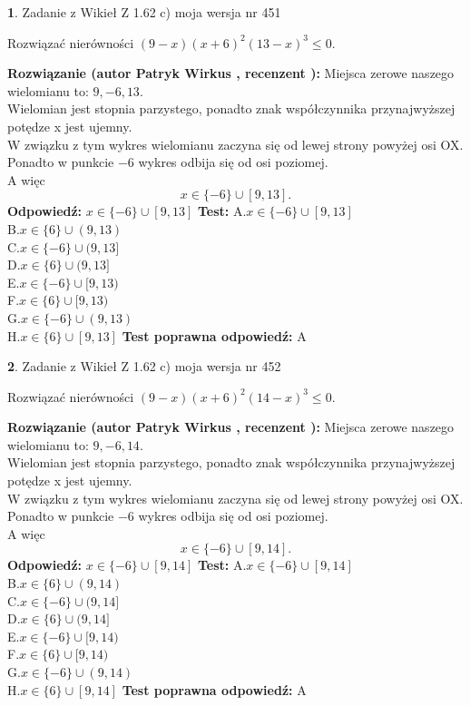 \documentclass[12pt, a4paper]{article}
\theoremstyle{definition} %
\newtheorem{zad}{}
\newcommand{\zadStart}[1]{\begin{zad}#1\newline}
\newcommand{\zadStop}{\end{zad}}
\newcommand{\rozwStart}[2]{\noindent \textbf{Rozwiązanie (autor #1 , recenzent #2): }\newline}
\newcommand{\rozwStop}{\newline}
\newcommand{\odpStart}{\noindent \textbf{Odpowiedź:}\newline}
\newcommand{\odpStop}{\newline}
\newcommand{\testStart}{\noindent \textbf{Test:}\newline}
\newcommand{\testStop}{\newline}
\newcommand{\kluczStart}{\noindent \textbf{Test poprawna odpowiedź:}\newline}
\newcommand{\kluczStop}{\newline}
\begin{document}
\zadStart{Zadanie z Wikieł Z 1.62 c) moja wersja nr 451}

Rozwiązać nierówności $(9-x)(x+6)^{2}(13-x)^{3}\le0$.
\zadStop
\rozwStart{Patryk Wirkus}{}
Miejsca zerowe naszego wielomianu to: $9, -6, 13$.\\
Wielomian jest stopnia parzystego, ponadto znak współczynnika przy\linebreak najwyższej potędze x jest ujemny.\\ W związku z tym wykres wielomianu zaczyna się od lewej strony powyżej osi OX.\\
Ponadto w punkcie $-6$ wykres odbija się od osi poziomej.\\
A więc $$x \in \{-6\} \cup [9,13].$$
\rozwStop
\odpStart
$x \in \{-6\} \cup [9,13]$
\odpStop
\testStart
A.$x \in \{-6\} \cup [9,13]$\\
B.$x \in \{6\} \cup (9,13)$\\
C.$x \in \{-6\} \cup (9,13]$\\
D.$x \in \{6\} \cup (9,13]$\\
E.$x \in \{-6\} \cup [9,13)$\\
F.$x \in \{6\} \cup [9,13)$\\
G.$x \in \{-6\} \cup (9,13)$\\
H.$x \in \{6\} \cup [9,13]$
\testStop
\kluczStart
A
\kluczStop



\zadStart{Zadanie z Wikieł Z 1.62 c) moja wersja nr 452}

Rozwiązać nierówności $(9-x)(x+6)^{2}(14-x)^{3}\le0$.
\zadStop
\rozwStart{Patryk Wirkus}{}
Miejsca zerowe naszego wielomianu to: $9, -6, 14$.\\
Wielomian jest stopnia parzystego, ponadto znak współczynnika przy\linebreak najwyższej potędze x jest ujemny.\\ W związku z tym wykres wielomianu zaczyna się od lewej strony powyżej osi OX.\\
Ponadto w punkcie $-6$ wykres odbija się od osi poziomej.\\
A więc $$x \in \{-6\} \cup [9,14].$$
\rozwStop
\odpStart
$x \in \{-6\} \cup [9,14]$
\odpStop
\testStart
A.$x \in \{-6\} \cup [9,14]$\\
B.$x \in \{6\} \cup (9,14)$\\
C.$x \in \{-6\} \cup (9,14]$\\
D.$x \in \{6\} \cup (9,14]$\\
E.$x \in \{-6\} \cup [9,14)$\\
F.$x \in \{6\} \cup [9,14)$\\
G.$x \in \{-6\} \cup (9,14)$\\
H.$x \in \{6\} \cup [9,14]$
\testStop
\kluczStart
A
\kluczStop
\end{document}

